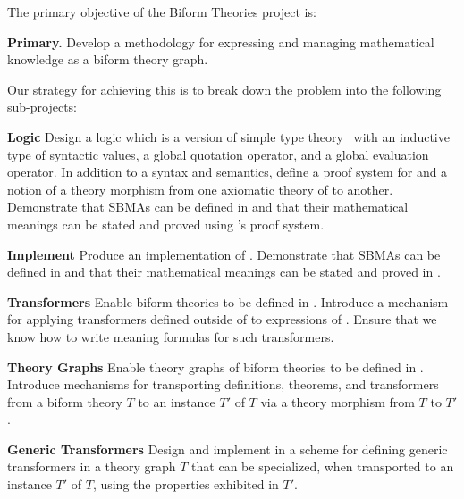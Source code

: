 \documentclass[fleqn]{llncs}
\begin{document}
The primary objective of the Biform Theories project is:

\bi

  \item[] \textbf{Primary.} Develop a methodology for expressing and
    managing mathematical knowledge as a biform theory graph.

\ei

\noindent
Our strategy for achieving this is to break down the problem
into the following sub-projects:

\bi

  \item[]\textbf{Logic} Design a logic  which is a
    version of simple type theory~\cite{Farmer08} with an inductive
    type of syntactic values, a global quotation operator, and a
    global evaluation operator.  In addition to a syntax and
    semantics, define a proof system for  and a notion of a
    theory morphism from one axiomatic theory of  to
    another.  Demonstrate that SBMAs can be defined in  and
    that their mathematical meanings can be stated and proved using
    's proof system.

\medskip

  \item[]\textbf{Implement} Produce an implementation  of
    .  Demonstrate that SBMAs can be defined in
     and that their mathematical meanings can be stated
    and proved in .

\medskip

  \item[]\textbf{Transformers} Enable biform theories to be defined in
    .  Introduce a mechanism for applying transformers
    defined outside of  to expressions of .
    Ensure that we know how to write meaning formulas for such
    transformers.

\medskip

  \item[]\textbf{Theory Graphs} Enable theory graphs of biform theories
    to be defined in .  Introduce mechanisms for
    transporting definitions, theorems, and transformers from a biform
    theory $T$ to an instance $T'$ of $T$ via a theory morphism from
    $T$ to $T'$.

\medskip

  \item[]\textbf{Generic Transformers} Design and implement in  a
    scheme for defining generic transformers in a theory graph $T$
    that can be specialized, when transported to an instance $T'$ of
    $T$, using the properties exhibited in $T'$.
\end{document}
